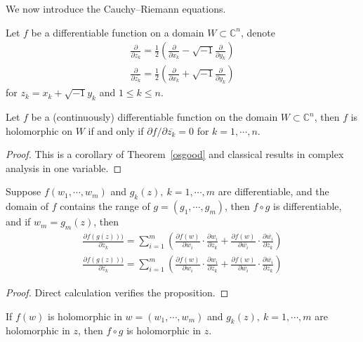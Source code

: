 We now introduce the Cauchy--Riemann equations.

\begin{sym}
    Let $f$ be a differentiable function on a domain $W\subset\mathbb{C}^n$, denote
    \begin{gather}
        \frac{\partial}{\partial z_k}=\frac{1}{2}\left(\frac{\partial}{\partial x_k}-\sqrt{-1}\frac{\partial}{\partial y_k}\right)\\
        \frac{\partial}{\partial\overline{z_k}}=\frac{1}{2}\left(\frac{\partial}{\partial x_k}+\sqrt{-1}\frac{\partial}{\partial y_k}\right)
    \end{gather}
    for $z_k=x_k+\sqrt{-1}y_k$ and $1\leq k\leq n$.
\end{sym}

\begin{thm}
    Let $f$ be a (continuously) differentiable function on the domain $W\subset\mathbb{C}^n$, then $f$ is holomorphic on $W$ if and only if $\partial{f}/\partial{\overline{z_k}}=0$ for $k=1,\cdots,n$.
\end{thm}
\begin{proof}
    This is a corollary of Theorem~\ref{osgood} and classical results in complex analysis in one variable.
\end{proof}

\begin{prop}
    Suppose $f(w_1,\cdots,w_m)$ and $g_k(z),\ k=1,\cdots,m$ are differentiable, and the domain of $f$ contains the range of $g=(g_1,\cdots,g_m)$, then $f\circ g$ is differentiable, and if $w_m=g_m(z)$, then
    \begin{gather*}
        \frac{\partial f(g(z)))}{\partial z_k}=\sum_{i=1}^m\left(\frac{\partial f(w)}{\partial w_i}\cdot\frac{\partial w_i}{\partial z_k}+\frac{\partial f(w)}{\partial\overline{w_i}}\cdot\frac{\partial\overline{w_i}}{\partial z_k}\right)\\
        \frac{\partial f(g(z)))}{\partial\overline{z_k}}=\sum_{i=1}^m\left(\frac{\partial f(w)}{\partial w_i}\cdot\frac{\partial w_i}{\partial\overline{z_k}}+\frac{\partial f(w)}{\partial\overline{w_i}}\cdot\frac{\partial\overline{w_i}}{\partial\overline{z_k}}\right)
    \end{gather*}
\end{prop}
\begin{proof}
    Direct calculation verifies the proposition.
\end{proof}

\begin{cor}
    If $f(w)$ is holomorphic in $w=(w_1,\cdots,w_m)$ and $g_k(z),\ k=1,\cdots,m$ are holomorphic in $z$, then $f\circ g$ is holomorphic in $z$.
\end{cor}

